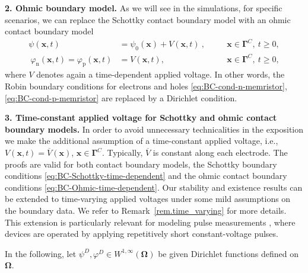 \documentclass[10pt,a4paper, final]{article}
\def\electrons{\text{n}}
\def\holes{\text{p}}
\theoremstyle{definition}								%
\numberwithin{equation}{section}
\numberwithin{figure}{section}
\numberwithin{theorem}{section}
\begin{document}
\noindent
\textbf{2. Ohmic boundary model.}
As we will see in the simulations, for specific scenarios, we can replace the Schottky contact boundary model with an ohmic contact boundary model
\begin{subequations}\label{eq:BC-Ohmic-time-dependent}
    \begin{alignat}{2}
        \psi(\mathbf{x}, t) &= \psi_0 ( \mathbf{x}) + V(\mathbf{x}, t)
        ~
        , \quad &&\mathbf{x} \in  \mathbf{\Gamma}^C, \ t \geq 0,\\
        ~
        \varphi_\electrons(\mathbf{x}, t)  = \varphi_\holes(\mathbf{x}, t) &= V (\mathbf{x}, t), \quad
        ~
        &&\mathbf{x} \in \mathbf{\Gamma}^C,  \ t \geq 0, \label{eq:BC-psi-Dirichlet}
    \end{alignat}
\end{subequations}
where $V$ denotes again a time-dependent applied voltage.
In other words, the Robin boundary conditions for electrons and holes \eqref{eq:BC-cond-n-memristor}, \eqref{eq:BC-cond-p-memristor} are replaced by a Dirichlet condition.

\noindent
\textbf{3. Time-constant applied voltage for Schottky and ohmic contact boundary models.}
In order to avoid unnecessary technicalities in the exposition we make the additional assumption of a time-constant applied voltage, i.e., $V(\mathbf{x}, t) = \overline{V} (\mathbf{x})$, $\mathbf{x} \in \mathbf{\Gamma}^C$.
Typically, $\overline{V}$ is constant along each electrode.
The proofs are valid for both contact boundary models, the Schottky boundary conditions \eqref{eq:BC-Schottky-time-dependent} and the ohmic contact boundary conditions \eqref{eq:BC-Ohmic-time-dependent}.
Our stability and existence results can be extended to time-varying applied voltages under some mild assumptions on the boundary data.
We refer to Remark~\ref{rem.time_varying} for more details.
This extension is particularly relevant for modeling pulse measurements \cite{Spetzler.2024}, where devices are operated by applying repetitively short constant-voltage pulses.

\noindent
In the following, let $\psi^D, \varphi^D \in W^{1, \infty}(\boldsymbol{\Omega})$ be given Dirichlet functions defined on $\mathbf{\Omega}$.
\end{document}
